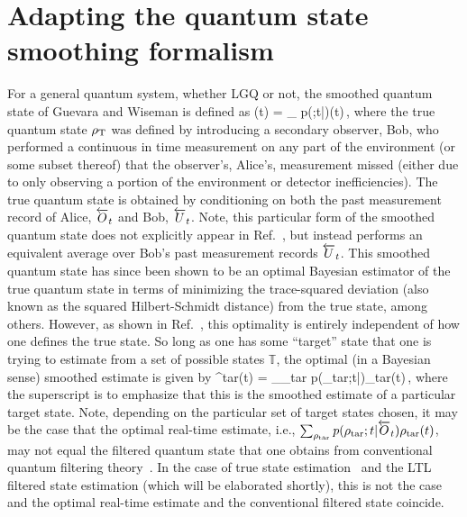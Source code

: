 \documentclass[./Main-revtex.tex]{subfiles}
\begin{document}
\section{Adapting the quantum state smoothing formalism}\label{sec:QSSforLTL}
For a general quantum system, whether LGQ or not, the smoothed quantum state of Guevara and Wiseman \cite{guevara2015quantum,LWCW23} is defined as 
\beq\label{eq:true-sm}
\rho\sm(t) = \sum_{\rho\god} p(\rho\god;t|)\rho\god(t)\,,
\eeq
where the true quantum state $\rho_{\text T}$ was defined by introducing a secondary observer, Bob, who performed a continuous in time measurement on any part of the environment (or some subset thereof) that the observer's, Alice's, measurement missed (either due to only observing a portion of the environment or detector inefficiencies). The true quantum state is obtained by conditioning on both the past measurement record of Alice, $\overleftarrow{O}_t$ and Bob, $\overleftarrow{U}_t$. Note, this particular form of the smoothed quantum state does not explicitly appear in Ref.~\cite{guevara2015quantum}, but instead performs an equivalent average over Bob's past measurement records $\overleftarrow{U}_t$. This smoothed quantum state has since been shown to be an optimal Bayesian estimator of the true quantum state \cite{CGLW21,LGW21} in terms of minimizing the trace-squared deviation (also known as the squared Hilbert-Schmidt distance) from the true state, among others. However, as shown in Ref.~\cite{LWCW23}, this optimality is entirely independent of how one defines the true state. So long as one has some ``target'' state that one is trying to estimate from a set of possible states ${\mathbb T}$, the optimal (in a Bayesian sense) smoothed estimate is given by
\beq\label{eq:gen-sm}
\rho\sm^{\rm tar}(t) = \sum_{\rho_{\rm tar}} p(\rho_{\rm tar};t|)\rho_{\rm tar}(t)\,,
\eeq
where the superscript is to emphasize that this is the smoothed estimate of a particular target state. 
Note, depending on the particular set of target states chosen, it may be the case that the optimal real-time estimate, i.e., $\sum_{\rho_{\rm tar}}p(\rho_{\rm tar};t|\overleftarrow{O}_t)\rho_{\rm tar}(t)$, may not equal the filtered quantum state that one obtains from conventional quantum filtering theory~\cite{Bel87,Bel92}. In the case of true state estimation~\cite{guevara2015quantum} and the LTL filtered state estimation (which will be elaborated shortly), this is not the case and the optimal real-time estimate and the conventional filtered state coincide.
\end{document}
